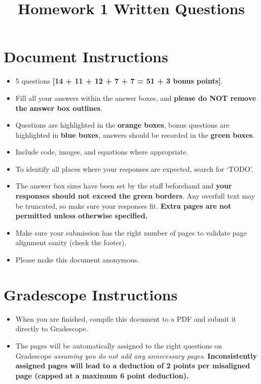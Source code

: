 \documentclass[11pt]{article}
\date{}
\title{\vspace{-1cm}Homework 1 Written Questions}
\begin{document}
\maketitle
\vspace{-3cm}
\thispagestyle{fancy}

\section*{ Document Instructions}
\begin{itemize}
  \item 5 questions \textbf{[14 + 11 + 12 + 7 + 7 = 51 + 3 bonus points]}.
  \item Fill all your answers within the answer boxes, and \textbf{please do NOT remove the answer box outlines}.
  \item Questions are highlighted in the \textbf{orange boxes}, bonus questions are highlighted in \textbf{blue boxes}, answers should be recorded in the \textbf{green boxes}.
  \item Include code, images, and equations where appropriate.
  \item To identify all places where your responses are expected, search for `TODO'.
  \item The answer box sizes have been set by the staff beforehand and \textbf{your responses should not exceed the green borders}. Any overfull text may be truncated, so make sure your responses fit. \textbf{Extra pages are not permitted unless otherwise specified.}
  \item Make sure your submission has the right number of pages to validate page alignment sanity (check the footer).
  \item Please make this document anonymous.
\end{itemize}

\section*{ Gradescope Instructions}
\begin{itemize}
  \item When you are finished, compile this document to a PDF and submit it directly to Gradescope. 
  \item The pages will be automatically assigned to the right questions on Gradescope \textit{assuming you do not add any unnecessary pages}. \textbf{Inconsistently assigned pages will lead to a deduction of 2 points per misaligned page (capped at a maximum 6 point deduction).}
\end{itemize}
\end{document}
